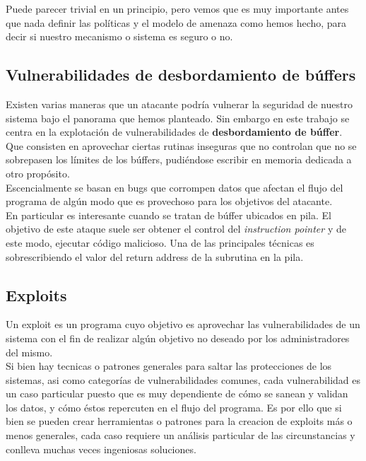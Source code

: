 \documentclass[12pt]{article}
\begin{document}
Puede parecer trivial en un principio, pero vemos que es muy importante antes que nada definir las políticas y el modelo de amenaza como hemos hecho, para decir si nuestro mecanismo o sistema es seguro o no.


\subsection{Vulnerabilidades de desbordamiento de búffers}
Existen varias maneras que un atacante podría vulnerar la seguridad de nuestro sistema bajo el panorama que hemos planteado. Sin embargo en este trabajo se centra en la explotación de vulnerabilidades de \textbf{desbordamiento de búffer}. Que consisten en aprovechar ciertas rutinas inseguras que no controlan que no se sobrepasen los límites de los búffers, pudiéndose escribir en memoria dedicada a otro propósito. \\

Escencialmente se basan en bugs que corrompen datos que afectan el flujo del programa de algún modo que es provechoso para los objetivos del atacante. \\

En particular es interesante cuando se tratan de búffer ubicados en pila. El objetivo de este ataque suele ser obtener el control del \textit{instruction pointer} y de este modo, ejecutar código malicioso. Una de las principales técnicas es sobrescribiendo el valor del return address de la subrutina en la pila.

\subsection{Exploits}
Un exploit es un programa cuyo objetivo es aprovechar las vulnerabilidades de un sistema con el fin de realizar algún objetivo no deseado por los administradores del mismo. \\

Si bien hay tecnicas o patrones generales para saltar las protecciones de los sistemas, asi como categorías de vulnerabilidades comunes, cada vulnerabilidad es un caso particular puesto que es muy dependiente de cómo se sanean y validan los datos, y cómo éstos repercuten en el flujo del programa. Es por ello que si bien se pueden crear herramientas o patrones para la creacion de exploits más o menos generales, cada caso requiere un análisis particular de las circunstancias y conlleva muchas veces ingeniosas soluciones.
\end{document}
